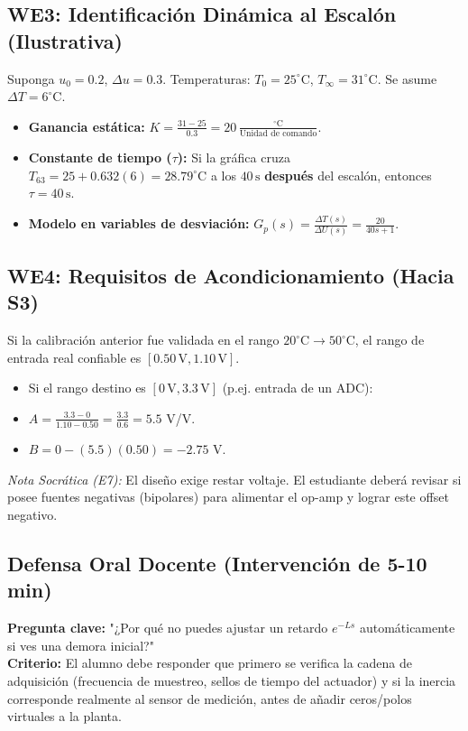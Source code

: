 \documentclass[11pt, a4paper]{article}
\begin{document}
\subsection*{WE3: Identificación Dinámica al Escalón (Ilustrativa)}
Suponga $u_0 = 0.2$, $\Delta u = 0.3$. Temperaturas: $T_0 = 25^\circ\text{C}$, $T_\infty = 31^\circ\text{C}$. Se asume $\Delta T = 6^\circ\text{C}$.
\begin{itemize}
    \item \textbf{Ganancia estática:} $K = \frac{31 - 25}{0.3} = 20\,\frac{^\circ\text{C}}{\text{Unidad de comando}}$.
    \item \textbf{Constante de tiempo ($\tau$):} Si la gráfica cruza $T_{63} = 25 + 0.632(6) = 28.79^\circ\text{C}$ a los $40\,\text{s}$ \textbf{después} del escalón, entonces $\tau = 40\,\text{s}$.
    \item \textbf{Modelo en variables de desviación:} $G_p(s) = \frac{\Delta T(s)}{\Delta U(s)} = \frac{20}{40s + 1}$.
\end{itemize}

\subsection*{WE4: Requisitos de Acondicionamiento (Hacia S3)}
Si la calibración anterior fue validada en el rango $20^\circ\text{C} \to 50^\circ\text{C}$, el rango de entrada real confiable es $[0.50\,\text{V}, 1.10\,\text{V}]$. 
\begin{itemize}
    \item Si el rango destino es $[0\,\text{V}, 3.3\,\text{V}]$ (p.ej. entrada de un ADC):
    \item $A = \frac{3.3 - 0}{1.10 - 0.50} = \frac{3.3}{0.6} = 5.5$ V/V.
    \item $B = 0 - (5.5)(0.50) = -2.75$ V.
\end{itemize}
\textit{Nota Socrática (E7):} El diseño exige restar voltaje. El estudiante deberá revisar si posee fuentes negativas (bipolares) para alimentar el op-amp y lograr este offset negativo.

\subsection*{Defensa Oral Docente (Intervención de 5-10 min)}
\textbf{Pregunta clave:} "¿Por qué no puedes ajustar un retardo $e^{-Ls}$ automáticamente si ves una demora inicial?" \\
\textbf{Criterio:} El alumno debe responder que primero se verifica la cadena de adquisición (frecuencia de muestreo, sellos de tiempo del actuador) y si la inercia corresponde realmente al sensor de medición, antes de añadir ceros/polos virtuales a la planta.
\end{document}
